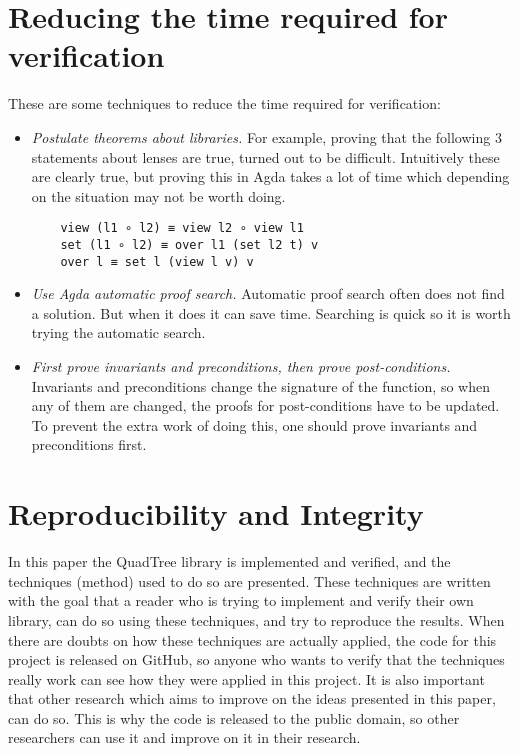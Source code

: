 \section{Reducing the time required for verification} \label{reduce_time}
These are some techniques to reduce the time required for verification:
\begin{itemize}
    \item \textit{Postulate theorems about libraries.} For example, proving that the following 3 statements about lenses are true, turned out to be difficult. Intuitively these are clearly true, but proving this in Agda takes a lot of time which depending on the situation may not be worth doing. 
    \begin{verbatim}
    view (l1 ∘ l2) ≡ view l2 ∘ view l1
    set (l1 ∘ l2) ≡ over l1 (set l2 t) v
    over l ≡ set l (view l v) v
    \end{verbatim}
    \item \textit{Use Agda automatic proof search.} Automatic proof search often does not find a solution. But when it does it can save time. Searching is quick so it is worth trying the automatic search.
    \item \textit{First prove invariants and preconditions, then prove post-conditions.} Invariants and preconditions change the signature of the function, so when any of them are changed, the proofs for post-conditions have to be updated. To prevent the extra work of doing this, one should prove invariants and preconditions first.
\end{itemize}

\section{Reproducibility and Integrity}
In this paper the QuadTree library is implemented and verified, and the techniques (method) used to do so are presented. These techniques are written with the goal that a reader who is trying to implement and verify their own library, can do so using these techniques, and try to reproduce the results. When there are doubts on how these techniques are actually applied, the code for this project is released on GitHub, so anyone who wants to verify that the techniques really work can see how they were applied in this project. It is also important that other research which aims to improve on the ideas presented in this paper, can do so. This is why the code is released to the public domain, so other researchers can use it and improve on it in their research.

